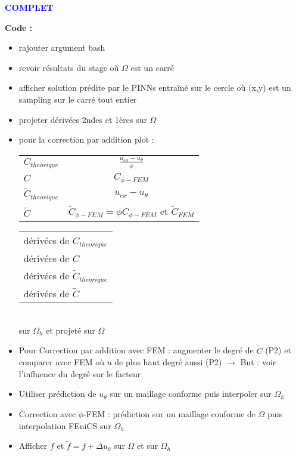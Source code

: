 \textcolor{blue}{\textbf{\large{COMPLET}}}

\textbf{Code :}
\begin{itemize}[label=$\square$] 
	\item[\done] rajouter argument bash
	\item[\later] revoir résultats du stage où $\Omega$ est un carré
	\item[\done] afficher solution prédite par le PINNs entraîné sur le cercle où (x,y) est un sampling sur le carré tout entier
	\item[\later] projeter dérivées 2ndes et 1ères sur $\Omega$
	\item[\later] pour la correction par addition plot : \\
	\begin{minipage}{0.48\linewidth}
		\begin{tabular}[\linewidth]{lc}
			$C_{theorique}$ & $\frac{u_{ex}-u_\theta}{\phi}$ \\
			$C$ & $C_{\phi-FEM}$ \\
			$\tilde{C}_{theorique}$ & $u_{ex}-u_\theta$ \\
			$\tilde{C}$ & $\tilde{C}_{\phi-FEM}=\phi C_{\phi-FEM}$ et $\tilde{C}_{FEM}$
		\end{tabular}
	\end{minipage}
	\begin{minipage}{0.48\linewidth}
		\begin{tabular}[\linewidth]{l}
			dérivées de $C_{theorique}$ \\
			dérivées de $C$ \\
			dérivées de $\tilde{C}_{theorique}$ \\
			dérivées de $\tilde{C}$
		\end{tabular}
	\end{minipage} \\
	sur $\Omega_h$ et projeté sur $\Omega$
	\item[\later] Pour Correction par addition avec FEM : augmenter le degré de $\tilde{C}$ (P2) et comparer avec FEM où $u$ de plus haut degré aussi (P2) $\rightarrow$ But : voir l'influence du degré sur le facteur
	\item[\later] Utiliser prédiction de $u_\theta$ sur un maillage conforme puis interpoler sur $\Omega_h$
	\item[\later] Correction avec $\phi$-FEM : prédiction sur un maillage conforme de $\Omega$ puis interpolation FEniCS sur $\Omega_h$
	\item[\later] Afficher $f$ et $\tilde{f}=f+\Delta u_\theta$ sur $\Omega$ et sur $\Omega_h$
\end{itemize}

